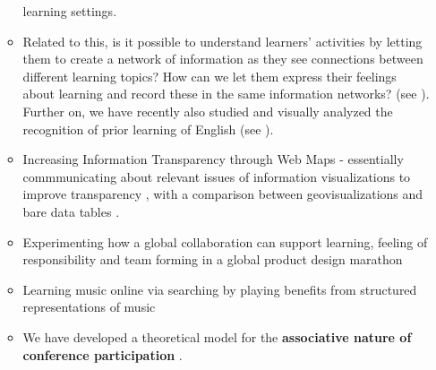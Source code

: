 \documentclass[11pt,letterpaper]{article}
\begin{document}
\begin{itemize}
\begin{itemize}
     learning settings.
     \item Related to this, is it possible to understand learners' activities by
     letting them to create a network of information as they see connections
     between different learning topics? How can we let them express their
     feelings about learning and record these in the same information networks?
     (see \cite{visual-self-assessment-2018}). Further on, we have recently also
     studied and visually analyzed the recognition of prior learning of English
     (see \cite{rpl-test-or-assess-2019}).
    \item Increasing Information Transparency through Web Maps -
   essentially commmunicating about relevant issues of information
   visualizations to improve transparency \cite{AW4city2018}, with a comparison
   between geovisualizations and bare data tables
   \cite{geoviz-data-tables-2018}.
    \item Experimenting how a global collaboration can support learning,
    feeling of responsibility and team forming in a global product design
    marathon \cite{global-design-relay-2017}
    \item Learning music online via searching by playing benefits from
     structured representations of music \cite{MusicOWL-2017}
    \item We have developed a theoretical model for the \textbf{associative
    nature of conference participation} \cite{associative-nature-2016}.


  \end{itemize}


\end{itemize}
\end{document}
